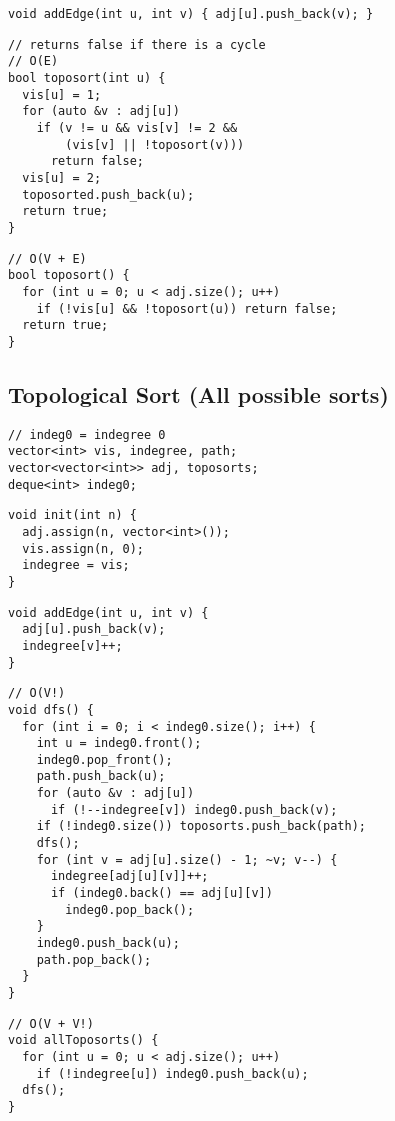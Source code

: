 \documentclass[twoside]{article}
\begin{document}
\begin{multicols*}{2}
\begin{verbatim}
void addEdge(int u, int v) { adj[u].push_back(v); }
\end{verbatim}
\vspace{-12pt}
\begin{verbatim}
// returns false if there is a cycle
// O(E)
bool toposort(int u) {
  vis[u] = 1;
  for (auto &v : adj[u])
    if (v != u && vis[v] != 2 &&
        (vis[v] || !toposort(v)))
      return false;
  vis[u] = 2;
  toposorted.push_back(u);
  return true;
}
\end{verbatim}
\vspace{-12pt}
\begin{verbatim}
// O(V + E)
bool toposort() {
  for (int u = 0; u < adj.size(); u++)
    if (!vis[u] && !toposort(u)) return false;
  return true;
}
\end{verbatim}

\subsectionfont{\large\bfseries\sffamily\underline}
\subsection*{Topological Sort (All possible sorts)}
\begin{verbatim}
// indeg0 = indegree 0
vector<int> vis, indegree, path;
vector<vector<int>> adj, toposorts;
deque<int> indeg0;
\end{verbatim}
\vspace{-12pt}
\begin{verbatim}
void init(int n) {
  adj.assign(n, vector<int>());
  vis.assign(n, 0);
  indegree = vis;
}
\end{verbatim}
\vspace{-12pt}
\begin{verbatim}
void addEdge(int u, int v) {
  adj[u].push_back(v);
  indegree[v]++;
}
\end{verbatim}
\vspace{-12pt}
\begin{verbatim}
// O(V!)
void dfs() {
  for (int i = 0; i < indeg0.size(); i++) {
    int u = indeg0.front();
    indeg0.pop_front();
    path.push_back(u);
    for (auto &v : adj[u])
      if (!--indegree[v]) indeg0.push_back(v);
    if (!indeg0.size()) toposorts.push_back(path);
    dfs();
    for (int v = adj[u].size() - 1; ~v; v--) {
      indegree[adj[u][v]]++;
      if (indeg0.back() == adj[u][v])
        indeg0.pop_back();
    }
    indeg0.push_back(u);
    path.pop_back();
  }
}
\end{verbatim}
\vspace{-12pt}
\begin{verbatim}
// O(V + V!)
void allToposorts() {
  for (int u = 0; u < adj.size(); u++)
    if (!indegree[u]) indeg0.push_back(u);
  dfs();
}
\end{verbatim}


\end{multicols*}
\end{document}
